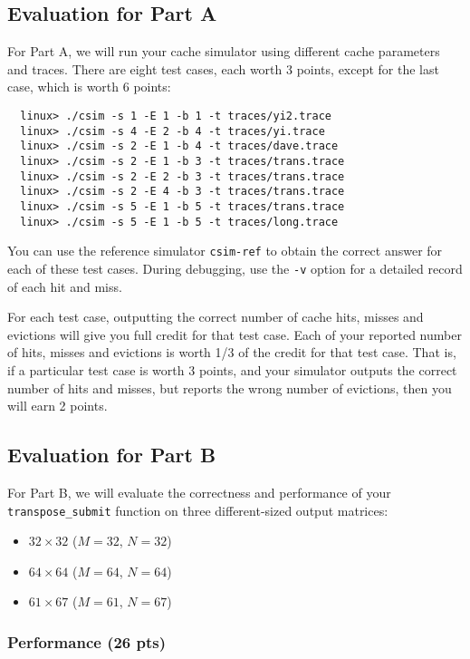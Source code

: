 \documentclass[11pt]{article}
\begin{document}
\subsection{Evaluation for Part A}
For Part A, we will run your cache simulator using different cache
parameters and traces.  There are eight test cases, each worth 3
points, except for the last case, which is worth 6 points:
\begin{verbatim}
  linux> ./csim -s 1 -E 1 -b 1 -t traces/yi2.trace
  linux> ./csim -s 4 -E 2 -b 4 -t traces/yi.trace
  linux> ./csim -s 2 -E 1 -b 4 -t traces/dave.trace
  linux> ./csim -s 2 -E 1 -b 3 -t traces/trans.trace
  linux> ./csim -s 2 -E 2 -b 3 -t traces/trans.trace
  linux> ./csim -s 2 -E 4 -b 3 -t traces/trans.trace
  linux> ./csim -s 5 -E 1 -b 5 -t traces/trans.trace
  linux> ./csim -s 5 -E 1 -b 5 -t traces/long.trace
\end{verbatim}
You can use the reference simulator \verb:csim-ref: to obtain the
correct answer for each of these test cases.  During debugging, use
the {\tt -v} option for a detailed record of each hit and miss.

For each test case, outputting the correct number of cache hits,
misses and evictions will give you full credit for that test case.
Each of your reported number of hits, misses and evictions is worth
1/3 of the credit for that test case.  That is, if a particular test
case is worth 3 points, and your simulator outputs the correct number
of hits and misses, but reports the wrong number of evictions, then
you will earn 2 points.

\subsection{Evaluation for Part B}

For Part B, we will evaluate the correctness and performance of your
 \verb:transpose_submit: function on three different-sized output matrices:
\begin{itemize}
\item $32 \times 32$ ($M=32$, $N=32$)
\item $64 \times 64$ ($M=64$, $N=64$)
\item $61 \times 67$ ($M=61$, $N=67$)
\end{itemize}


\subsubsection{Performance (26 pts)}
\end{document}
